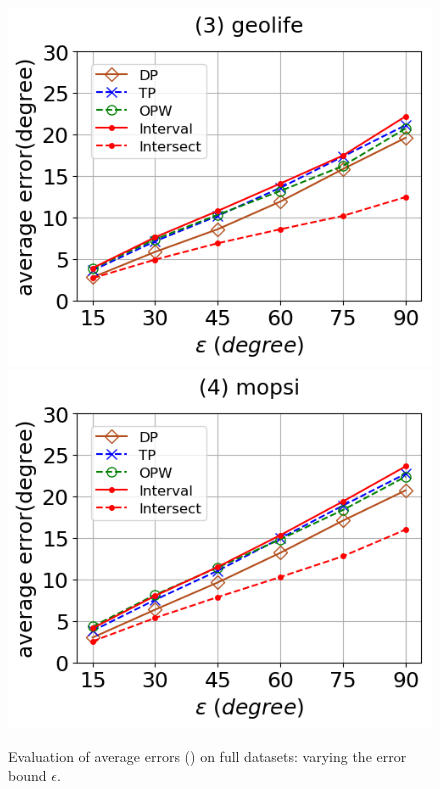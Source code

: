 \begin{figure}[tb!]
	\includegraphics[scale=0.315]{Figures/Exp-DAD-error-epsilon-geolife.png}	\hspace{1ex}
	\includegraphics[scale=0.315]{Figures/Exp-DAD-error-epsilon-mopsi.png}	
	\vspace{-3ex}
	\caption{\small Evaluation of average errors (\dad) on full datasets: varying the error bound $\epsilon$.}
	\label{fig:ae-dad-ped-epsilon}
	\vspace{-2ex}
\end{figure}


